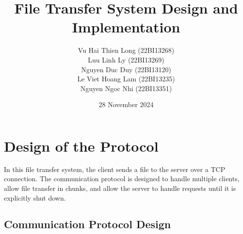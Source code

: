 \documentclass{article}
\title{File Transfer System Design and Implementation}
\author{Vu Hai Thien Long (22BI13268) \\ Luu Linh Ly (22BI13269) \\ Nguyen Duc Duy (22BI13120) \\ Le Viet Hoang Lam (22BI13235) \\ Nguyen Ngoc Nhi (22BI13351)}
\date{28 November 2024}
\begin{document}
\maketitle



\section{Design of the Protocol}

In this file transfer system, the client sends a file to the server over a TCP connection. The communication protocol is designed to handle multiple clients, allow file transfer in chunks, and allow the server to handle requests until it is explicitly shut down.

\subsection{Communication Protocol Design}
\end{document}
